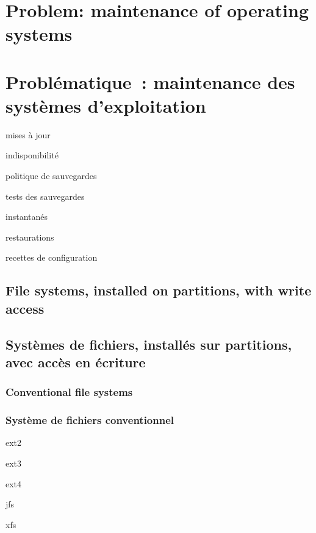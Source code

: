 \ml
{\chapter{Problem: maintenance of operating systems}}
{\chapter{Problématique : maintenance des systèmes d’exploitation}}

\begin{itmz}
\item{
{mises à jour}}
\item{
{indisponibilité}}
\item{
{politique de sauvegardes}}
\item{
{tests des sauvegardes}}
\item{
{instantanés}}
\item{
{restaurations}}
\item{
{recettes de configuration}}
\end{itmz}

\ml
{\section{File systems, installed on partitions, with write access}}
{\section{Systèmes de fichiers, installés sur partitions, avec accès en écriture}}

\ml
{\subsection{Conventional file systems}}
{\subsection{Système de fichiers conventionnel}}

\begin{itmz}
\item{ext2}
\item{ext3}
\item{ext4}
\item{jfs}
\item{xfs}
\end{itmz}

